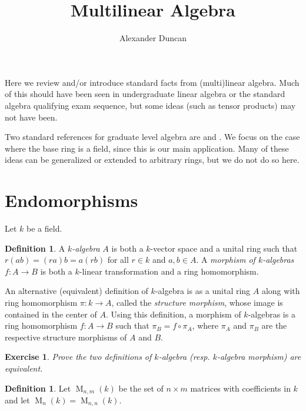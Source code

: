 \documentclass[12pt]{article}
\theoremstyle{plain}
\newtheorem{exercise}[theorem]{Exercise}
\theoremstyle{definition}
\newtheorem{definition}[theorem]{Definition}
\theoremstyle{remark}
\numberwithin{equation}{section}
\begin{document}
\title{Multilinear Algebra}
\author{Alexander Duncan}

\maketitle

Here we review and/or introduce standard facts from (multi)linear algebra.
Much of this should have been seen in undergraduate linear algebra or the
standard algebra qualifying exam sequence, but some ideas (such as
tensor products) may not have been.

Two standard references for graduate level algebra are
\cite{DF} and \cite{Lang}.  We focus on the case where the base ring is
a field, since this is our main application.
Many of these ideas can be generalized or extended to arbitrary rings,
but we do not do so here.

\section{Endomorphisms}

Let $k$ be a field.

\begin{definition}
A \emph{$k$-algebra} $A$ is both a $k$-vector space and a unital ring
such that $r(ab)=(ra)b=a(rb)$ for all $r \in k$ and $a,b \in A$.
A \emph{morphism of $k$-algebras} $f \colon A \to B$ is both a
$k$-linear transformation and a ring homomorphism.
\end{definition}

An alternative (equivalent) definition of $k$-algebra is as a
unital ring $A$ along with ring homomorphism $\pi : k \to A$,
called the \emph{structure morphism}, whose image is contained in
the center of $A$.  Using this definition,
a morphism of $k$-algebras is a ring homomorphism $f\colon A \to B$ such
that $\pi_B = f \circ \pi_A$, where $\pi_A$ and $\pi_B$ are the
respective structure morphisms of $A$ and $B$.

\begin{exercise}
Prove the two definitions of $k$-algebra (resp. $k$-algebra morphism) are
equivalent.
\end{exercise}

\begin{definition}
Let $\operatorname{M}_{n,m}(k)$ be the set of
$n \times m$ matrices with coefficients in $k$ and
let $\operatorname{M}_{n}(k) = \operatorname{M}_{n,n}(k)$. 
\end{definition}
\end{document}
